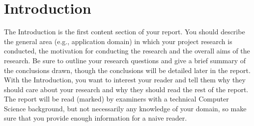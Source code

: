 \section{Introduction}

The Introduction is the first content section of your report. You should describe the general area (e.g., application domain) in which your project research is conducted, the motivation for conducting the research and the overall aims of the research. Be sure to outline your research questions and give a brief summary of the conclusions drawn, though the conclusions will be detailed later in the report. With the Introduction, you want to interest your reader and tell them why they should care about your research and why they should read the rest of the report. The report will be read (marked) by examiners with a technical Computer Science background, but not necessarily any knowledge of your domain, so make sure that you provide enough information for a naive reader.
